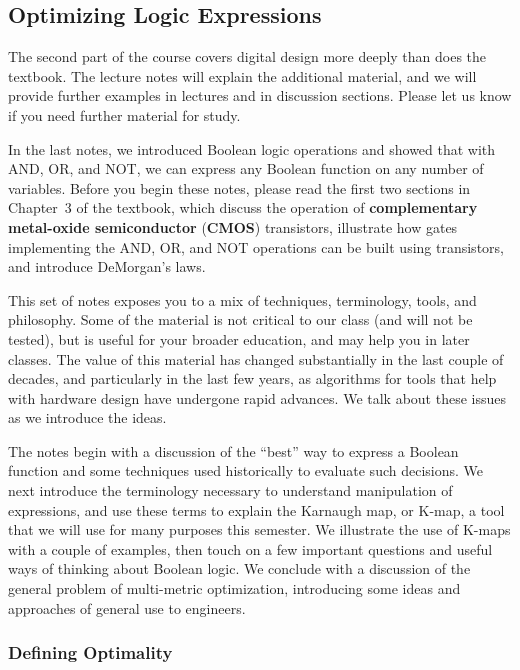 \classtitle

\subsection{Optimizing Logic Expressions}

The second part of the course covers digital design more
deeply than does the textbook.  The lecture notes will explain the
additional material, and we will provide further examples in lectures
and in discussion sections.  Please let us know if you need further
material for study.

In the last notes, we introduced Boolean logic operations and showed
that with AND, OR, and NOT, we can express any Boolean function on any
number of variables.
%
Before you begin these notes, please read the first two sections 
in Chapter~3 of the textbook,
which discuss the operation of {\bf complementary metal-oxide semiconductor}
({\bf CMOS}) transistors, illustrate how gates implementing the
AND, OR, and NOT operations can be built using transistors,
and introduce DeMorgan's laws. 

This set of notes exposes you to a mix of techniques,
terminology, tools, and philosophy.  Some of the material is not
critical to our class (and will not be tested), but is useful for
your broader education, and may help you in later classes.  The value
of this material has changed substantially in the last couple of decades,
and particularly in the last few years, as algorithms for tools
that help with hardware design have undergone rapid advances.  We
talk about these issues as we introduce the ideas.

The notes begin with a discussion of the ``best'' way to
express a Boolean function and some techniques used historically
to evaluate such decisions.
%
We next introduce the terminology necessary to understand manipulation
of expressions, and use these terms to explain the Karnaugh map, or
\mbox{K-map}, a tool that we will use for many purposes this semester.
%
We illustrate the use of \mbox{K-maps} with a couple of
examples, then touch on a few important questions and useful
ways of thinking about Boolean logic.
%
We conclude with a discussion of the general problem of 
multi-metric optimization, introducing some ideas and approaches
of general use to engineers.\\


\subsubsection{Defining Optimality}

